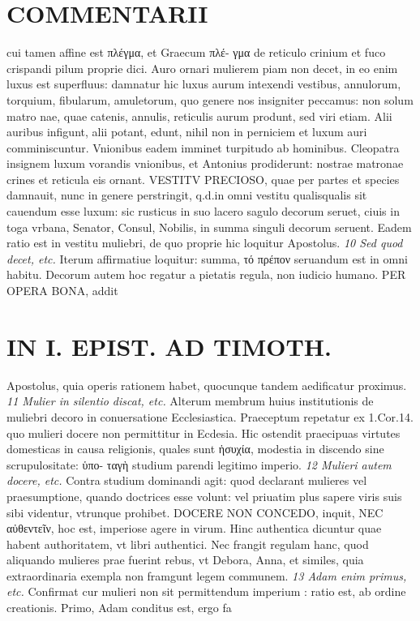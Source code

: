 \documentclass{article}
\begin{document}
\begin{pages}
\section*{COMMENTARII }
\marginpar{[ p.56 ]}\pstart cui tamen affine est πλέγμα, et Graecum πλέ- γμα de reticulo crinium et fuco crispandi pilum proprie dici.  \pend\pstart Auro ornari mulierem piam non decet, in eo enim luxus est superfluus: damnatur hic luxus aurum intexendi vestibus, annulorum, torquium, fibularum, amuletorum, quo genere nos insigniter peccamus: non solum matro nae, quae catenis, annulis, reticulis aurum produnt, sed viri etiam. Alii auribus infigunt, alii potant, edunt, nihil non in perniciem et luxum auri comminiscuntur.  \pend\pstart Vnionibus eadem imminet turpitudo ab hominibus. Cleopatra insignem luxum vorandis vnionibus, et Antonius prodiderunt: nostrae matronae crines et reticula eis ornant. VESTITV PRECIOSO, quae per partes et species damnauit, nunc in genere perstringit, q.d.in omni vestitu qualisqualis sit cauendum esse luxum: sic rusticus in suo lacero sagulo decorum seruet, ciuis in toga vrbana, Senator, Consul, Nobilis, in summa singuli decorum seruent. Eadem ratio est in vestitu muliebri, de quo proprie hic loquitur Apostolus.  \pend
\textit{10 Sed quod decet, etc. }\pstart Iterum affirmatiue loquitur: summa, τό πρέπον seruandum est in omni habitu. Decorum autem hoc regatur a pietatis regula, non iudicio humano. PER OPERA BONA, addit  \pend
\section*{IN I. EPIST. AD TIMOTH. }
\marginpar{[ p.57 ]}\pstart Apostolus, quia operis rationem habet, quocunque tandem aedificatur proximus.  \pend
\textit{11 Mulier in silentio discat, etc. }\pstart Alterum membrum huius institutionis de muliebri decoro in conuersatione Ecclesiastica. Praeceptum repetatur ex 1.Cor.14. quo mulieri docere non permittitur in Ecdesia. Hic ostendit praecipuas virtutes domesticas in causa religionis, quales sunt ἡσυχία, modestia in discendo sine scrupulositate: ὑπο- ταγὴ studium parendi legitimo imperio.  \pend
\textit{12 Mulieri autem docere, etc. }\pstart Contra studium dominandi agit: quod declarant mulieres vel praesumptione, quando doctrices esse volunt: vel priuatim plus sapere viris suis sibi videntur, vtrunque prohibet. DOCERE NON CONCEDO, inquit, NEC αὐθεντεῖν, hoc est, imperiose agere in virum. Hinc authentica dicuntur quae habent authoritatem, vt libri authentici. Nec frangit regulam hanc, quod aliquando mulieres prae fuerint rebus, vt Debora, Anna, et similes, quia extraordinaria exempla non framgunt legem communem.  \pend
\textit{13 Adam enim primus, etc. }\pstart Confirmat cur mulieri non sit permittendum imperium : ratio est, ab ordine creationis. Primo, Adam conditus est, ergo fa\pend

\end{pages}
\end{document}
